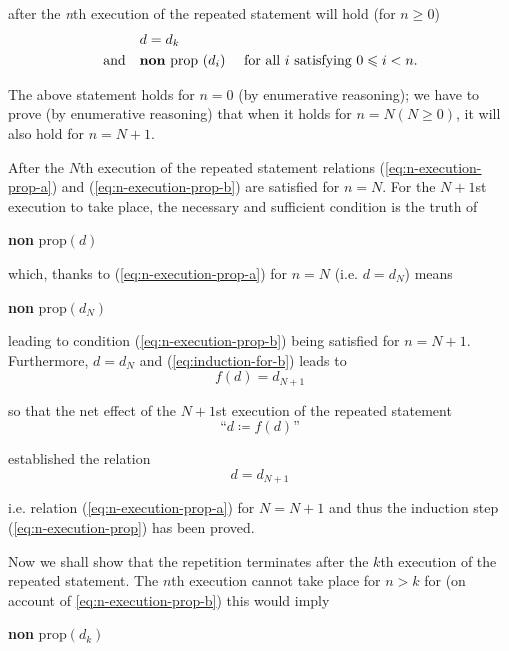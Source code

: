 \quad after the \textit{n}th execution of the repeated statement will hold (for $n \geqslant 0$)
\begin{subequations}
	\label{eq:n-execution-prop}
	\begin{align}
		\label{eq:n-execution-prop-a}
		&d=d_k& \\
		\label{eq:n-execution-prop-b}
		\text{and}\quad &\text{\textbf{non} prop }(d_i) &\text{ for all } i \text{ satisfying } 0 \leqslant i < n.
	\end{align}
\end{subequations}

The above statement holds for $n = 0$ (by enumerative reasoning); we have to prove (by enumerative reasoning) that when it holds for $n = N(N \geqslant 0)$, it will also hold for $n = N + 1$.

After the $N$th execution of the repeated statement relations (\ref{eq:n-execution-prop-a}) and (\ref{eq:n-execution-prop-b}) are satisfied for $n = N$. For the $N + 1$st execution to take place, the necessary and sufficient condition is the truth of
\begin{center}
	\textbf{non} prop$(d)$
\end{center}

\noindent
which, thanks to (\ref{eq:n-execution-prop-a}) for $n = N$ (i.e. $d = d_N$) means
\begin{center}
	\textbf{non} prop$(d_N)$
\end{center}

\noindent 
leading to condition (\ref{eq:n-execution-prop-b}) being satisfied for $n = N + 1$. Furthermore, $d = d_N$ and (\ref{eq:induction-for-b}) leads to
$$
f(d) = d_{N + 1}
$$

\noindent
so that the net effect of the $N + 1$st execution of the repeated statement
$$
\text{``}d \coloneq f(d)\text{''}
$$

\noindent
established the relation
$$
d = d_{N + 1}
$$

\noindent
i.e. relation (\ref{eq:n-execution-prop-a}) for $N = N + 1$ and thus the induction step (\ref{eq:n-execution-prop}) has been
proved.

Now we shall show that the repetition terminates after the $k$th execution of the repeated statement. The $n$th execution cannot take place for $n > k$
for (on account of \ref{eq:n-execution-prop-b}) this would imply
\begin{center}
	\textbf{non} prop$(d_k)$
\end{center}

